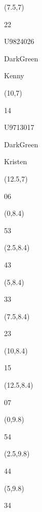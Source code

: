 \documentclass[a4paper]{article}
\newcommand{\myseat}[4]{%
\vspace{-0.1cm}
\parbox[t][2.2cm][t]{3.5cm}{
\small #1 %
\begin{description}
\vspace{-0.1cm}
\item [ID:] #2
\vspace{-0.1cm}
\item [Team:] #3 \normalsize
\vspace{-0.1cm}
\item \normalsize #4
\vspace{-0.1cm}
\end{description}
}
}
\begin{document}
\begin{CJK}{UTF8}{cyberbit}
\begin{textblock}{2.5}(7.5,7)
\myseat{22}{U9824026}{DarkGreen}{Kenny}
\end{textblock}

\begin{textblock}{2.5}(10,7)
\myseat{14}{U9713017}{DarkGreen}{Kristen}
\end{textblock}

\begin{textblock}{2.5}(12.5,7)
\textblockcolor{}
\myseat{06}{}{}{}
\end{textblock}

\begin{textblock}{2.5}(0,8.4)
\textblockcolor{}
\myseat{53}{}{}{}
\end{textblock}

\begin{textblock}{2.5}(2.5,8.4)
\textblockcolor{}
\myseat{43}{}{}{}
\end{textblock}

\begin{textblock}{2.5}(5,8.4)
\textblockcolor{}
\myseat{33}{}{}{}
\end{textblock}

\begin{textblock}{2.5}(7.5,8.4)
\textblockcolor{}
\myseat{23}{}{}{}
\end{textblock}

\begin{textblock}{2.5}(10,8.4)
\textblockcolor{}
\myseat{15}{}{}{}
\end{textblock}

\begin{textblock}{2.5}(12.5,8.4)
\textblockcolor{}
\myseat{07}{}{}{}
\end{textblock}

\begin{textblock}{2.5}(0,9.8)
\textblockcolor{}
\myseat{54}{}{}{}
\end{textblock}

\begin{textblock}{2.5}(2.5,9.8)
\textblockcolor{}
\myseat{44}{}{}{}
\end{textblock}

\begin{textblock}{2.5}(5,9.8)
\textblockcolor{}
\myseat{34}{}{}{}
\end{textblock}


\end{CJK}
\end{document}
